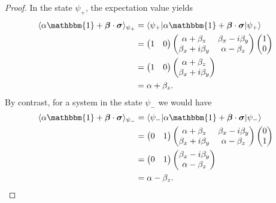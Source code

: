 \documentclass[12pt]{article}
\begin{document}
\begin{proof}
  In the state $\psi_{+}$, the expectation value yields
  \begin{displaymath}
    \begin{split}
      \langle \alpha \mathbbm{1} + \bm{\beta} \cdot \bm{\sigma} \rangle_{\psi_{+}}
      &= \langle \psi_{+} | \alpha \mathbbm{1} + \bm{\beta} \cdot \bm{\sigma} | \psi_{+} \rangle \\
      &=
      \begin{pmatrix}
        1 & 0
      \end{pmatrix}
      \begin{pmatrix}
        \alpha + \beta_z & \beta_x - i \beta_y \\
        \beta_x + i \beta_y & \alpha - \beta_z
      \end{pmatrix}
      \begin{pmatrix}
        1 \\
        0
      \end{pmatrix}
      \\
      &=
      \begin{pmatrix}
        1 & 0
      \end{pmatrix}
      \begin{pmatrix}
        \alpha + \beta_z \\
        \beta_x + i\beta_y
      \end{pmatrix}
      \\
      &= \alpha + \beta_z.
    \end{split}
  \end{displaymath}
  By contrast, for a system in the state $\psi_{-}$ we would have
  \begin{displaymath}
    \begin{split}
      \langle \alpha \mathbbm{1} + \bm{\beta} \cdot \bm{\sigma} \rangle_{\psi_{-}}
      &= \langle \psi_{-} | \alpha \mathbbm{1} + \bm{\beta} \cdot \bm{\sigma} | \psi_{-} \rangle \\
      &=
      \begin{pmatrix}
        0 & 1
      \end{pmatrix}
      \begin{pmatrix}
        \alpha + \beta_z & \beta_x - i \beta_y \\
        \beta_x + i \beta_y & \alpha - \beta_z
      \end{pmatrix}
      \begin{pmatrix}
        0 \\
        1
      \end{pmatrix}
      \\
      &=
      \begin{pmatrix}
        0 & 1
      \end{pmatrix}
      \begin{pmatrix}
        \beta_x - i \beta_y \\
        \alpha - \beta_z
      \end{pmatrix}
      \\
      &= \alpha - \beta_z.
    \end{split}
  \end{displaymath}
\end{proof}
\end{document}
